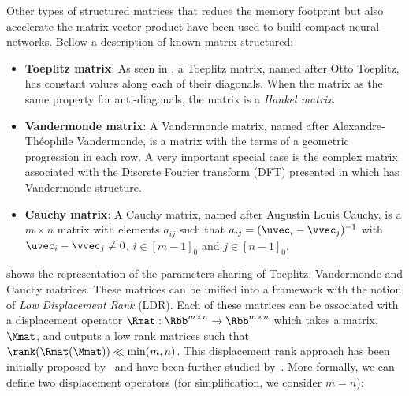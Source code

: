 Other types of structured matrices that reduce the memory footprint but also accelerate the matrix-vector product have been used to build compact neural networks.
Bellow a description of known matrix structured:
\begin{itemize}
  \item \textbf{Toeplitz matrix}: As seen in , a Toeplitz matrix, named after Otto Toeplitz, has constant values along each of their diagonals. When the matrix as the same property for anti-diagonals, the matrix is a \emph{Hankel matrix}.
  \item \textbf{Vandermonde matrix}: A Vandermonde matrix, named after Alexandre-Théophile Vandermonde, is a matrix with the terms of a geometric progression in each row.  
    A very important special case is the complex matrix associated with the Discrete Fourier transform (DFT) presented in  which has Vandermonde structure.
  \item \textbf{Cauchy matrix}: A Cauchy matrix, named after Augustin Louis Cauchy, is a $m \times n$ matrix with elements $a_{ij}$ such that $a_{ij} = (\uvec_i - \vvec_j)^{-1}$ with $\uvec_i - \vvec_j \neq 0$, $i \in [m-1]_0$ and $j \in [n-1]_0$.
\end{itemize}
 shows the representation of the parameters sharing of Toeplitz, Vandermonde and Cauchy matrices.
These matrices can be unified into a framework with the notion of \emph{Low Displacement Rank} (LDR).
Each of these matrices can be associated with a displacement operator $\Rmat: \Rbb^{m \times n} \rightarrow \Rbb^{m \times n}$ which takes a matrix, $\Mmat$, and outputs a low rank matrices such that $\rank(\Rmat(\Mmat)) \ll \min(m,n)$.
This displacement rank approach has been initially proposed by~\citet{kailath1979displacement} and have been further studied by~\citet{kailath1995displacement,pan2001structured}. 
More formally, we can define two displacement operators (for simplification, we consider $m = n$):
